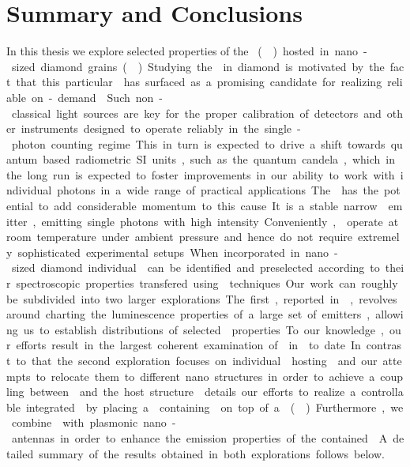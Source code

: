 

 \chapter*{Summary and Conclusions}	\label{ch::conclusion}

   In this thesis we explore selected properties of the \si \cc (\siv) hosted in nano-sized diamond grains (\nds). Studying the \sivc in diamond is motivated by the fact that this particular \cc has surfaced as a promising candidate for realizing reliable on-demand \spss. Such non-classical light sources are key for the proper calibration of detectors and other instruments designed to operate reliably in the single-photon counting regime. This in turn is expected to drive a shift towards quantum based radiometric SI units, such as the quantum candela, which in the long run is expected to foster improvements in our ability to work with individual photons in a wide range of practical applications.

   The \siv has the potential to add considerable momentum to this cause. It is a stable narrow \lw emitter, emitting single photons with high intensity. Conveniently, \sivs operate at room temperature under ambient pressure and hence do not require extremely sophisticated experimental setups. When incorporated in nano-sized diamond individual \sivs can be identified and preselected according to their spectroscopic properties transfered using \pp techniques. 

   Our work can roughly be subdivided into two larger explorations. The first, reported in , revolves around charting the luminescence properties of a large set of emitters, allowing us to establish distributions of selected \siv properties. To our knowledge, our efforts result in the largest coherent examination of \sivs in \nds to date. In contrast to that the second exploration focuses on individual \nds hosting \sivs and our attempts to relocate them to different nano structures in order to achieve a coupling between \sivs and the host structure.  details our efforts to realize a controllable integrated \sps by placing a \nd containing \sivs on top of a \vcsel (\VCSEL). Furthermore, we combine \nds with plasmonic nano-antennas in order to enhance the emission properties of the contained \sivs. A detailed summary of the results obtained in both explorations follows below.

